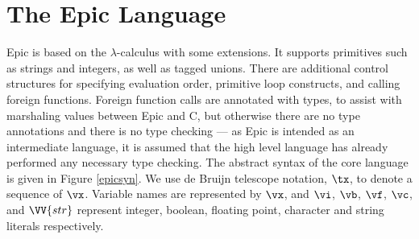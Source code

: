 \section{The Epic Language}

Epic is based on the $\lambda$-calculus with some extensions.  It supports
primitives such as strings and integers, as well as tagged unions. There are
additional control structures for specifying evaluation order, primitive loop
constructs, and calling foreign functions. Foreign function calls are annotated
with types, to assist with marshaling values between Epic and C, but otherwise
there are no type annotations and there is no type checking --- as Epic is
intended as an intermediate language, it is assumed that the high level
language has already performed any necessary type checking. The abstract syntax
of the core language is given in Figure \ref{epicsyn}.  We use de Bruijn
telescope notation, $\tx$, to denote a sequence of $\vx$. Variable names are
represented by $\vx$, and $\vi$, $\vb$, $\vf$, $\vc$, and $\VV{str}$ represent
integer, boolean, floating point, character and string literals respectively.

\newcommand{\Con}[2]{\DC{Con}\:#1(#2)}

